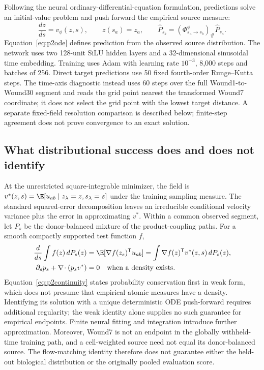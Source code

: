\documentclass[10pt,a4paper]{article}
\begin{document}
Following the neural ordinary-differential-equation formulation, predictions solve an initial-value problem and push forward the empirical source measure:
\begin{equation}
\frac{dz}{ds}=v_\phi(z,s),\qquad z(s_a)=z_a,\qquad
\widehat P_{s_b}=(\Phi^\phi_{s_a\rightarrow s_b})_\#\widehat P_{s_a}.\label{eq:p2ode}
\end{equation}
Equation~\eqref{eq:p2ode} defines prediction from the observed source distribution. The network uses two 128-unit SiLU hidden layers and a 32-dimensional sinusoidal time embedding. Training uses Adam with learning rate $10^{-3}$, 8,000 steps and batches of 256. Direct target predictions use 50 fixed fourth-order Runge--Kutta steps. The time-axis diagnostic instead uses 60 steps over the full Wound1-to-Wound30 segment and reads the grid point nearest the transformed Wound7 coordinate; it does not select the grid point with the lowest target distance. A separate fixed-field resolution comparison is described below; finite-step agreement does not prove convergence to an exact solution.

\subsection{What distributional success does and does not identify}
At the unrestricted square-integrable minimizer, the field is $v^*(z,s)=\E[u_{ab}\mid z_\lambda=z,s_\lambda=s]$ under the training sampling measure. The standard squared-error decomposition leaves an irreducible conditional velocity variance plus the error in approximating $v^*$. Within a common observed segment, let $P_s$ be the donor-balanced mixture of the product-coupling paths. For a smooth compactly supported test function $f$,
\begin{align}
\frac{d}{ds}\int f(z)\,dP_s(z)&=\E[\nabla f(z_s)^{\mathsf T}u_{ab}]
=\int\nabla f(z)^{\mathsf T}v^*(z,s)\,dP_s(z),\notag\\
\partial_s p_s+\nabla\!\cdot(p_sv^*)&=0\quad\text{when a density exists}.\label{eq:p2continuity}
\end{align}
Equation~\eqref{eq:p2continuity} states probability conservation first in weak form, which does not presume that empirical atomic measures have a density. Identifying its solution with a unique deterministic ODE push-forward requires additional regularity; the weak identity alone supplies no such guarantee for empirical endpoints. Finite neural fitting and integration introduce further approximation. Moreover, Wound7 is not an endpoint in the globally withheld-time training path, and a cell-weighted source need not equal its donor-balanced source. The flow-matching identity therefore does not guarantee either the held-out biological distribution or the originally pooled evaluation score.
\end{document}
